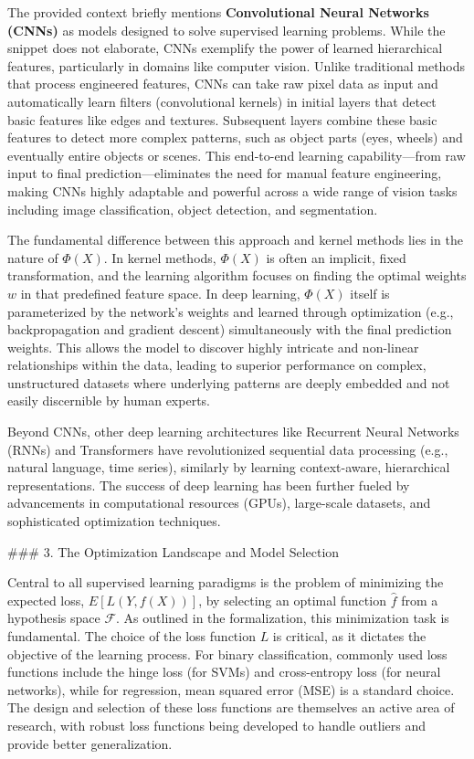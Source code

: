 \documentclass{article}
\begin{document}
The provided context briefly mentions \textbf{Convolutional Neural Networks (CNNs)} as models designed to solve supervised learning problems. While the snippet does not elaborate, CNNs exemplify the power of learned hierarchical features, particularly in domains like computer vision. Unlike traditional methods that process engineered features, CNNs can take raw pixel data as input and automatically learn filters (convolutional kernels) in initial layers that detect basic features like edges and textures. Subsequent layers combine these basic features to detect more complex patterns, such as object parts (eyes, wheels) and eventually entire objects or scenes. This end-to-end learning capability—from raw input to final prediction—eliminates the need for manual feature engineering, making CNNs highly adaptable and powerful across a wide range of vision tasks including image classification, object detection, and segmentation.

The fundamental difference between this approach and kernel methods lies in the nature of $\Phi(X)$. In kernel methods, $\Phi(X)$ is often an implicit, fixed transformation, and the learning algorithm focuses on finding the optimal weights $w$ in that predefined feature space. In deep learning, $\Phi(X)$ itself is parameterized by the network's weights and learned through optimization (e.g., backpropagation and gradient descent) simultaneously with the final prediction weights. This allows the model to discover highly intricate and non-linear relationships within the data, leading to superior performance on complex, unstructured datasets where underlying patterns are deeply embedded and not easily discernible by human experts.

Beyond CNNs, other deep learning architectures like Recurrent Neural Networks (RNNs) and Transformers have revolutionized sequential data processing (e.g., natural language, time series), similarly by learning context-aware, hierarchical representations. The success of deep learning has been further fueled by advancements in computational resources (GPUs), large-scale datasets, and sophisticated optimization techniques.

\#\#\# 3. The Optimization Landscape and Model Selection

Central to all supervised learning paradigms is the problem of minimizing the expected loss, $E[L(Y, f(X))]$, by selecting an optimal function $\hat{f}$ from a hypothesis space $\mathcal{F}$. As outlined in the formalization, this minimization task is fundamental. The choice of the loss function $L$ is critical, as it dictates the objective of the learning process. For binary classification, commonly used loss functions include the hinge loss (for SVMs) and cross-entropy loss (for neural networks), while for regression, mean squared error (MSE) is a standard choice. The design and selection of these loss functions are themselves an active area of research, with robust loss functions being developed to handle outliers and provide better generalization.
\end{document}
